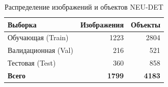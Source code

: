 \begin{table}[t]
\caption{Распределение изображений и объектов NEU-DET}
\label{tab:dataset}
\centering
\footnotesize
\setlength{\tabcolsep}{3.7pt}
\begin{tabular}{@{}lrr@{}}
\toprule
Выборка & Изображения & Объекты \\
\midrule
Обучающая (Train) & 1223 & 2804 \\
Валидационная (Val) & 216 & 521 \\
Тестовая (Test) & 360 & 858 \\
\midrule
\textbf{Всего} & \textbf{1799} & \textbf{4183} \\
\bottomrule
\end{tabular}
\end{table}
